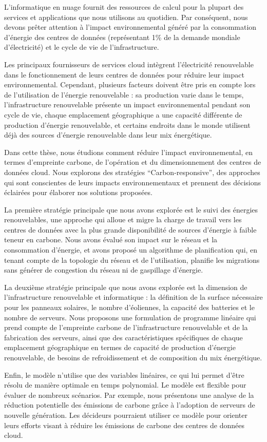 L'informatique en nuage fournit des ressources de calcul pour la plupart des services et applications que nous utilisons au quotidien. Par conséquent, nous devons prêter attention à l'impact environnemental généré par la consommation d'énergie des centres de données (représentant 1\% de la demande mondiale d'électricité) et le cycle de vie de l'infrastructure.


Les principaux fournisseurs de services cloud intègrent l'électricité renouvelable dans le fonctionnement de leurs centres de données pour réduire leur impact environnemental. Cependant, plusieurs facteurs doivent être pris en compte lors de l'utilisation de l'énergie renouvelable : sa production varie dans le temps, l'infrastructure renouvelable présente un impact environnemental pendant son cycle de vie, chaque emplacement géographique a une capacité différente de production d'énergie renouvelable, et certains endroits dans le monde utilisent déjà des sources d'énergie renouvelable dans leur mix énergétique.


Dans cette thèse, nous étudions comment réduire l'impact environnemental, en termes d'empreinte carbone, de l'opération et du dimensionnement des centres de données cloud. Nous explorons des stratégies ``Carbon-responsive'', des approches qui sont conscientes de leurs impacts environnementaux et prennent des décisions éclairées pour élaborer nos solutions proposées.

La première stratégie principale que nous avons explorée est le suivi des énergies renouvelables, une approche qui alloue et migre la charge de travail vers les centres de données avec la plus grande disponibilité de sources d'énergie à faible teneur en carbone. Nous avons évalué son impact sur le réseau et la consommation d'énergie, et avons proposé un algorithme de planification qui, en tenant compte de la topologie du réseau et de l'utilisation, planifie les migrations sans générer de congestion du réseau ni de gaspillage d'énergie.

La deuxième stratégie principale que nous avons explorée est la dimension de l'infrastructure renouvelable et informatique : la définition de la surface nécessaire pour les panneaux solaires, le nombre d'éoliennes, la capacité des batteries et le nombre de serveurs. Nous proposons une formulation de programme linéaire qui prend compte de l'empreinte carbone de l'infrastructure renouvelable et de la fabrication des serveurs, ainsi que des caractéristiques spécifiques de chaque emplacement géographique en termes de capacité de production d'énergie renouvelable, de besoins de refroidissement et de composition du mix énergétique.

Enfin, le modèle n'utilise que des variables linéaires, ce qui lui permet d'être résolu de manière optimale en temps polynomial. Le modèle est flexible pour évaluer de nombreux scénarios. Par exemple, nous présentons une analyse de la réduction potentielle des émissions de carbone grâce à l'adoption de serveurs de nouvelle génération. Les décideurs pourraient utiliser ce modèle pour orienter leurs efforts visant à réduire les émissions de carbone des centres de données cloud.





